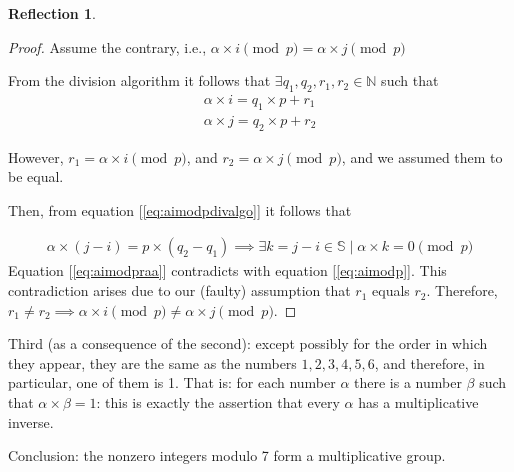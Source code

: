 \documentclass[english,notitlepage,smartquotes]{hgbreport}
\theoremstyle{definition}
\theoremstyle{definition}
\theoremstyle{remark}
\theoremstyle{definition}
\theoremstyle{plain}
\theoremstyle{definition}
\newtheorem{reflection}{Reflection}
\begin{document}
\begin{enumerate}
\begin{reflection}
\begin{proof}
Assume the contrary, i.e., $\alpha\times i\pmod p=\alpha\times j\pmod p$

From the division algorithm it follows that $\exists q_1,q_2,r_1,r_2\in\mathbb{N}$ such that
\begin{equation}
\begin{aligned}
\alpha\times i=q_1\times p+r_1\\
\alpha\times j=q_2\times p+r_2
\end{aligned}\label{eq:aimodpdivalgo}
\end{equation}

However, $r_1=\alpha\times i\pmod p$, and $r_2=\alpha\times j\pmod p$, and we assumed them to be equal.

Then, from equation [\ref{eq:aimodpdivalgo}] it follows that

\begin{equation}
\begin{aligned}
\alpha\times(j-i)=p\times(q_2-q_1)\implies\exists k=j-i\in\mathbb{S}\mid\alpha\times k=0\pmod p
\end{aligned}\label{eq:aimodpraa}
\end{equation}
Equation [\ref{eq:aimodpraa}] contradicts with equation [\ref{eq:aimodp}]. This contradiction arises due to our (faulty) assumption that $r_1$ equals $r_2$. Therefore, $r_1\ne r_2\implies\alpha\times i\pmod p\ne\alpha\times j\pmod p$.
\end{proof}
\end{reflection}

Third (as a consequence of the second): except possibly for the order in which they appear, they are the same as the numbers $1,2,3,4,5,6$, and therefore, in particular, one of them is 1. That is: for each number $\alpha$ there is a number $\beta$ such that $\alpha\times\beta=1$: this is exactly the assertion that every $\alpha$ has a multiplicative inverse. 

Conclusion: the nonzero integers modulo 7 form a multiplicative group.

\end{enumerate}

\hrulefill
\end{document}
